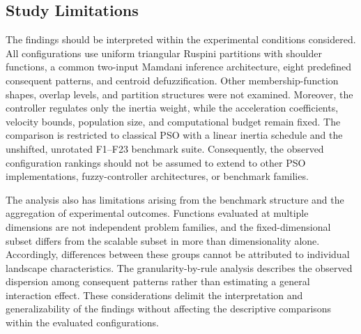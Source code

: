 \subsection{Study Limitations}
\label{subsec:limitations}

The findings should be interpreted within the experimental conditions considered. All configurations use uniform triangular Ruspini partitions with shoulder functions, a common two-input Mamdani inference architecture, eight predefined consequent patterns, and centroid defuzzification. Other membership-function shapes, overlap levels, and partition structures were not examined. Moreover, the controller regulates only the inertia weight, while the acceleration coefficients, velocity bounds, population size, and computational budget remain fixed. The comparison is restricted to classical PSO with a linear inertia schedule and the unshifted, unrotated F1--F23 benchmark suite. Consequently, the observed configuration rankings should not be assumed to extend to other PSO implementations, fuzzy-controller architectures, or benchmark families.

The analysis also has limitations arising from the benchmark structure and the aggregation of experimental outcomes. Functions evaluated at multiple dimensions are not independent problem families, and the fixed-dimensional subset differs from the scalable subset in more than dimensionality alone. Accordingly, differences between these groups cannot be attributed to individual landscape characteristics. The granularity-by-rule analysis describes the observed dispersion among consequent patterns rather than estimating a general interaction effect. These considerations delimit the interpretation and generalizability of the findings without affecting the descriptive comparisons within the evaluated configurations.

